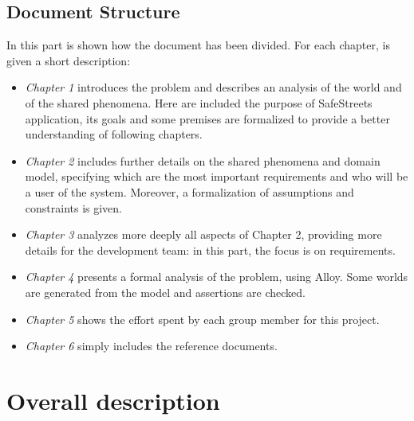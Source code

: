 \documentclass{article}
\begin{document}
		\subsection{Document Structure}
			In this part is shown how the document has been divided. For each chapter, is given a short description:
			\begin{itemize}
				\item \textit{Chapter 1} introduces the problem and describes an analysis of the world and of the shared phenomena. Here are included the purpose of SafeStreets application, its goals and some premises are formalized to provide a better understanding of following chapters.
				\item \textit{Chapter 2} includes further details on the shared phenomena and domain model, specifying which are the most important requirements and who will be a user of the system. Moreover, a formalization of assumptions and constraints is given.
				\item \textit{Chapter 3} analyzes more deeply all aspects of Chapter 2, providing more details for the development team: in this part, the focus is on requirements.
				\item \textit{Chapter 4} presents a formal analysis of the problem, using Alloy. Some worlds are generated from the model and assertions are checked.
				\item \textit{Chapter 5} shows the effort spent by each group member for this project.
				\item \textit{Chapter 6} simply includes the reference documents.
			\end{itemize}
	
	\newpage










	\section{Overall description}
\end{document}
